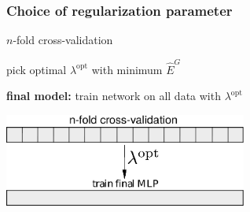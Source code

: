\begin{frame}\frametitle{Choice of regularization parameter}
	\begin{block}{$n$-fold cross-validation}
		\vspace{2mm}

		pick optimal $\lambda^{\text{opt}}$ with minimum $\widehat{E}^G$\\
		\vspace{2mm}

		\textbf{final model:} train network on all data with $\lambda^{\text{opt}}$ 
	\end{block}
	
	\vspace{2mm}
	\begin{center}
		\includegraphics[width=8cm]{img/nfoldcrossvalidation.pdf} 
	\end{center}
\end{frame}


